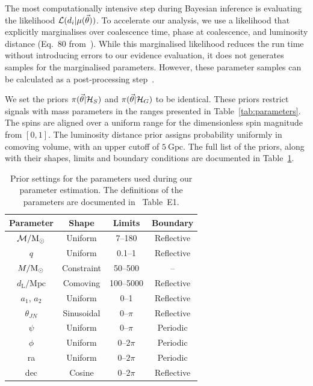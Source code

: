 \documentclass[%
 nofootinbib,
 amsmath,amssymb,
 aps,
 twocolumn
]{revtex4-2}
\newcommand{\mathcmd}[1]{{\sc \relax\ifmmode#1\else $#1$\fi}\xspace}
\newcommand{\msun}{\mathcmd{\text{M}_\odot}}
\newcommand{\parameters}{\mathcmd{\vec{\theta}}}
\newcommand{\template}{\mathcmd{\mu(\parameters)}}
\begin{document}
The most computationally intensive step during Bayesian inference is evaluating the likelihood $\mathcal{L}(d_i|\template)$. To accelerate our analysis, we use a likelihood that explicitly marginalises over coalescence time, phase at coalescence, and luminosity distance (Eq.~80 from~\citet{intro_to_gw_bayes}). While this marginalised likelihood reduces the run time without introducing errors to our evidence evaluation, it does not generates samples for the marginalised parameters. However, these parameter samples can be calculated as a post-processing step~\cite{intro_to_gw_bayes}.

We set the priors $\pi(\parameters|\mathcal{H}_S)$ and $\pi(\parameters|\mathcal{H}_G)$ to be identical. These priors restrict signals with mass parameters in the ranges presented in Table~\ref{tab:parameters}. The spins are aligned over a uniform range for the dimensionless spin magnitude from $\left[0,1\right]$. The luminosity distance prior assigns probability uniformly in comoving volume, with an upper cutoff of $5\ \text{Gpc}$. The full list of the priors, along with their shapes, limits and boundary conditions are documented in Table~\ref{tab:priors}. 

\begin{table}
    \centering
    \caption{
    Prior settings for the parameters used during our parameter estimation. The definitions of the parameters are documented in \citet{bilby_gwtc}~Table~E1.\label{tab:priors}}
    \begin{tabular}{c c c c}
    \hline
    Parameter & Shape & Limits & Boundary \\
    \hline
          $\mathcal{M}/\msun$           & Uniform & 7--180 & Reflective \\
          $q$                           & Uniform & 0.1--1 & Reflective \\
          $M/\msun$                     & Constraint & 50--500 & -- \\
          $d_\mathrm{L}/\mathrm{Mpc}$   & Comoving & 100--5000 & Reflective \\
          $a_1$, $a_2$                  & Uniform & 0--1 & Reflective \\
          $\theta_{JN}$                 & Sinusoidal & 0--$\pi$ &  Reflective \\
          $\psi$                        & Uniform & 0--$\pi$ &  Periodic \\
          $\phi$                        & Uniform & 0--$2\pi$ &  Periodic \\
          ra                            & Uniform & 0--$2\pi$ &  Periodic \\
          dec                           & Cosine & 0--$2\pi$ &  Reflective \\
    \hline
    \end{tabular}
\end{table}
\end{document}
